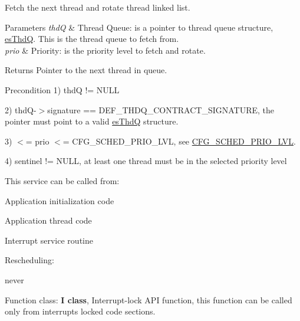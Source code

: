 Fetch the next thread and rotate thread linked list. 


\begin{DoxyParams}{Parameters}
{\em thd\-Q} & Thread Queue\-: is a pointer to thread queue structure, \hyperlink{structesThdQ}{es\-Thd\-Q}. This is the thread queue to fetch from. \\
\hline
{\em prio} & Priority\-: is the priority level to fetch and rotate. \\
\hline
\end{DoxyParams}
\begin{DoxyReturn}{Returns}
Pointer to the next thread in queue. 
\end{DoxyReturn}
\begin{DoxyPrecond}{Precondition}
1) {\ttfamily thd\-Q != N\-U\-L\-L} 

2) {\ttfamily thd\-Q-\/$>$signature == D\-E\-F\-\_\-\-T\-H\-D\-Q\-\_\-\-C\-O\-N\-T\-R\-A\-C\-T\-\_\-\-S\-I\-G\-N\-A\-T\-U\-R\-E}, the pointer must point to a valid \hyperlink{structesThdQ}{es\-Thd\-Q} structure. 

3) { $<$= prio $<$= C\-F\-G\-\_\-\-S\-C\-H\-E\-D\-\_\-\-P\-R\-I\-O\-\_\-\-L\-V\-L}, see \hyperlink{group__template__kern__cfg_ga56bd89fe76f7fe22f3d8805bc3c68892}{C\-F\-G\-\_\-\-S\-C\-H\-E\-D\-\_\-\-P\-R\-I\-O\-\_\-\-L\-V\-L}. 

4) {\ttfamily sentinel != N\-U\-L\-L}, at least one thread must be in the selected priority level 
\end{DoxyPrecond}
\begin{DoxyParagraph}{This service can be called from\-:}

\begin{DoxyItemize}
\item Application initialization code
\item Application thread code
\item Interrupt service routine 
\end{DoxyItemize}
\end{DoxyParagraph}
\begin{DoxyParagraph}{Rescheduling\-:}

\begin{DoxyItemize}
\item never 
\end{DoxyItemize}
\end{DoxyParagraph}
\begin{DoxyParagraph}{Function class\-:}
{\bfseries I class}, Interrupt-\/lock A\-P\-I function, this function can be called only from interrupts locked code sections. 
\end{DoxyParagraph}
